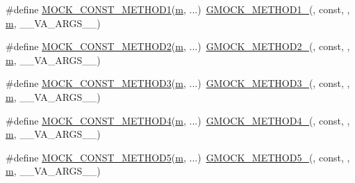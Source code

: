 \begin{DoxyCompactItemize}
\item 
\#define \hyperlink{gmock-generated-function-mockers_8h_a6f76aeb56f492cfe538e177b6aa77965}{M\+O\+C\+K\+\_\+\+C\+O\+N\+S\+T\+\_\+\+M\+E\+T\+H\+O\+D1}(\hyperlink{app_2main_8cpp_a0d2d8836216fc94b61aa0824eb239db2}{m}, ...)~\hyperlink{gmock-generated-function-mockers_8h_a1bc0012d62440dda77208dabdf4925c9}{G\+M\+O\+C\+K\+\_\+\+M\+E\+T\+H\+O\+D1\+\_\+}(, const, , \hyperlink{app_2main_8cpp_a0d2d8836216fc94b61aa0824eb239db2}{m}, \+\_\+\+\_\+\+V\+A\+\_\+\+A\+R\+G\+S\+\_\+\+\_\+)
\item 
\#define \hyperlink{gmock-generated-function-mockers_8h_a31c489715704817a3f40d178404c61e8}{M\+O\+C\+K\+\_\+\+C\+O\+N\+S\+T\+\_\+\+M\+E\+T\+H\+O\+D2}(\hyperlink{app_2main_8cpp_a0d2d8836216fc94b61aa0824eb239db2}{m}, ...)~\hyperlink{gmock-generated-function-mockers_8h_a885295ca6bebb15efb3fc786218c5d47}{G\+M\+O\+C\+K\+\_\+\+M\+E\+T\+H\+O\+D2\+\_\+}(, const, , \hyperlink{app_2main_8cpp_a0d2d8836216fc94b61aa0824eb239db2}{m}, \+\_\+\+\_\+\+V\+A\+\_\+\+A\+R\+G\+S\+\_\+\+\_\+)
\item 
\#define \hyperlink{gmock-generated-function-mockers_8h_a9e67763df6705172e1a2ae92f1446bbc}{M\+O\+C\+K\+\_\+\+C\+O\+N\+S\+T\+\_\+\+M\+E\+T\+H\+O\+D3}(\hyperlink{app_2main_8cpp_a0d2d8836216fc94b61aa0824eb239db2}{m}, ...)~\hyperlink{gmock-generated-function-mockers_8h_af7c77ba511c631de02bb8c45a6ed3045}{G\+M\+O\+C\+K\+\_\+\+M\+E\+T\+H\+O\+D3\+\_\+}(, const, , \hyperlink{app_2main_8cpp_a0d2d8836216fc94b61aa0824eb239db2}{m}, \+\_\+\+\_\+\+V\+A\+\_\+\+A\+R\+G\+S\+\_\+\+\_\+)
\item 
\#define \hyperlink{gmock-generated-function-mockers_8h_a4614e9d6b24dff60c30dd4dedf494c6c}{M\+O\+C\+K\+\_\+\+C\+O\+N\+S\+T\+\_\+\+M\+E\+T\+H\+O\+D4}(\hyperlink{app_2main_8cpp_a0d2d8836216fc94b61aa0824eb239db2}{m}, ...)~\hyperlink{gmock-generated-function-mockers_8h_ab6430f2cfad9de4aca5258ea559294bb}{G\+M\+O\+C\+K\+\_\+\+M\+E\+T\+H\+O\+D4\+\_\+}(, const, , \hyperlink{app_2main_8cpp_a0d2d8836216fc94b61aa0824eb239db2}{m}, \+\_\+\+\_\+\+V\+A\+\_\+\+A\+R\+G\+S\+\_\+\+\_\+)
\item 
\#define \hyperlink{gmock-generated-function-mockers_8h_ab7021ec2b869e7c9ea90363ee675f19b}{M\+O\+C\+K\+\_\+\+C\+O\+N\+S\+T\+\_\+\+M\+E\+T\+H\+O\+D5}(\hyperlink{app_2main_8cpp_a0d2d8836216fc94b61aa0824eb239db2}{m}, ...)~\hyperlink{gmock-generated-function-mockers_8h_a9e3ecd392499ab19a4a6d3adcabf56f6}{G\+M\+O\+C\+K\+\_\+\+M\+E\+T\+H\+O\+D5\+\_\+}(, const, , \hyperlink{app_2main_8cpp_a0d2d8836216fc94b61aa0824eb239db2}{m}, \+\_\+\+\_\+\+V\+A\+\_\+\+A\+R\+G\+S\+\_\+\+\_\+)

\end{DoxyCompactItemize}

